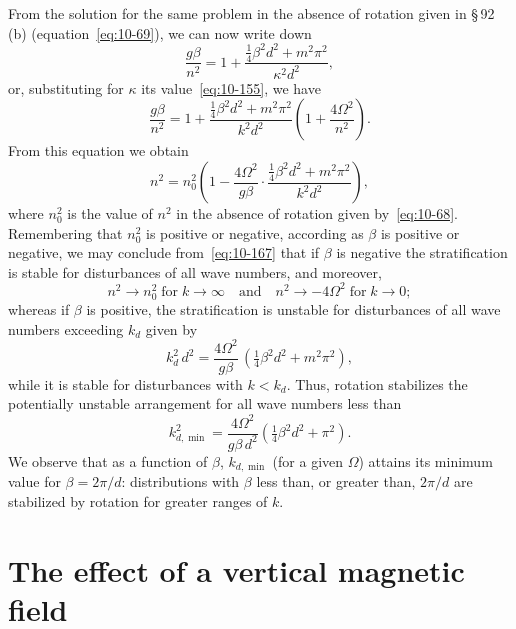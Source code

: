 From the solution for the same problem in the absence of rotation given in \S\,92\,(b) (equation~\eqref{eq:10-69}), we can now write down
\begin{equation}
\label{eq:10-165}
\frac{g\beta}{n^2} = 1+\frac{\frac{1}{4}\beta^2d^2+m^2\pi^2}{\kappa^2 d^2},
\end{equation}
or, substituting for $\kappa$ its value~\eqref{eq:10-155}, we have
\begin{equation}
\label{eq:10-166}
\frac{g\beta}{n^2} = 1+\frac{\frac{1}{4}\beta^2d^2+m^2\pi^2}{k^2d^2}\!\left(1+\frac{4\Omega^2}{n^2}\right)\!.
\end{equation}
From this equation we obtain
\begin{equation}
\label{eq:10-167}
n^2 = n_0^2\!\left(1-\frac{4\Omega^2}{g\beta}\cdot\frac{\frac{1}{4}\beta^2d^2+m^2\pi^2}{k^2d^2}\right)\!,
\end{equation}
where $n_0^2$ is the value of $n^2$ in the absence of rotation given by~\eqref{eq:10-68}. Remembering that $n_0^2$ is positive or negative, according as $\beta$ is positive or negative, we may conclude from~\eqref{eq:10-167} that if $\beta$ is negative the stratification is stable for disturbances of all wave numbers, and moreover,
\begin{equation}
\label{eq:10-168}
n^2 \to n_0^2\;\text{for}\;k\to\infty \quad\text{and}\quad n^2 \to -4\Omega^2\;\text{for}\;k\to 0;
\end{equation}
whereas if $\beta$ is positive, the stratification is unstable for disturbances of all wave numbers exceeding $k_d$ given by
\begin{equation}
\label{eq:10-169}
k_d^2\,d^2 = \frac{4\Omega^2}{g\beta}\,(\tfrac{1}{4}\beta^2d^2+m^2\pi^2),
\end{equation}
while it is stable for disturbances with $k < k_d$. Thus, rotation stabilizes the potentially unstable arrangement for all wave numbers less than
\begin{equation}
\label{eq:10-170}
k_{d,\min}^2 = \frac{4\Omega^2}{g\beta\,d^2}(\tfrac{1}{4}\beta^2d^2+\pi^2).
\end{equation}
We observe that as a function of $\beta$, $k_{d,\min}$ (for a given $\Omega$) attains its minimum value for $\beta = 2\pi/d$: distributions with $\beta$ less than, or greater than, $2\pi/d$ are stabilized by rotation for greater ranges of $k$.

\section{The effect of a vertical magnetic field}\label{sec:96}

